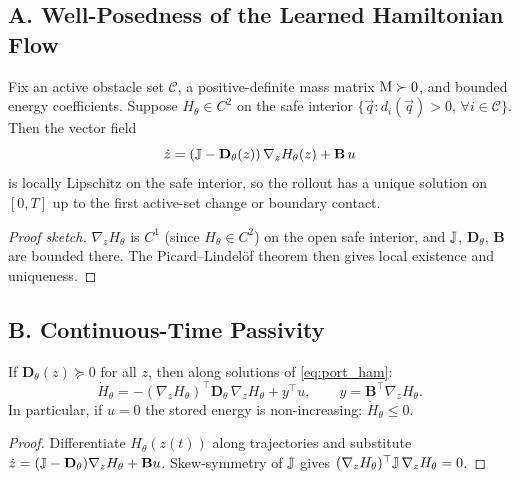 \subsection*{A. Well-Posedness of the Learned Hamiltonian Flow}

\begin{lemma}
\label{lem:wellposed}
Fix an active obstacle set $\mathcal{C}$, a positive-definite mass matrix
$\mathrm{M} \succ 0$, and bounded energy coefficients.
Suppose $H_\theta \in C^2$ on the safe interior
$\{\vec{q} : d_i(\vec{q}) > 0,\, \forall i \in \mathcal{C}\}$.
Then the vector field
\[
  \dot{z} = (\mathbb{J} - \mathbf{D}_\theta(z))\,\nabla_z H_\theta(z) + \mathbf{B}\,u
\]
is locally Lipschitz on the safe interior, so the rollout has a unique
solution on $[0,T]$ up to the first active-set change or boundary contact.
\end{lemma}

\begin{proof}[Proof sketch]
$\nabla_z H_\theta$ is $C^1$ (since $H_\theta \in C^2$) on the open safe
interior, and $\mathbb{J}$, $\mathbf{D}_\theta$, $\mathbf{B}$ are bounded there.
The Picard--Lindel\"of theorem then gives local existence and uniqueness.
\end{proof}

\subsection*{B. Continuous-Time Passivity}

\begin{theorem}
\label{thm:passivity}
If $\mathbf{D}_\theta(z) \succeq 0$ for all $z$, then along solutions of
\eqref{eq:port_ham}:
\[
  \dot{H}_\theta = -(\nabla_z H_\theta)^\top \mathbf{D}_\theta\,\nabla_z H_\theta
                  + y^\top u,
  \qquad y = \mathbf{B}^\top \nabla_z H_\theta.
\]
In particular, if $u = 0$ the stored energy is non-increasing:
$\dot{H}_\theta \leq 0$.
\end{theorem}

\begin{proof}
Differentiate $H_\theta(z(t))$ along trajectories and substitute
$\dot{z} = (\mathbb{J} - \mathbf{D}_\theta)\nabla_z H_\theta + \mathbf{B}u$.
Skew-symmetry of $\mathbb{J}$ gives $(\nabla_z H_\theta)^\top \mathbb{J}\,\nabla_z H_\theta = 0$.
\end{proof}

